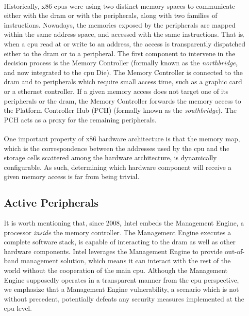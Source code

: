 
\paragraph{}
%
Historically, x86 \acp{cpu} were using two distinct memory spaces to communicate
either with the \ac{dram} or with the peripherals, along with two families of
instructions.
%
Nowadays, the memories exposed by the peripherals are mapped within the same
address space, and accessed with the same instructions.
%
That is, when a \ac{cpu} read at or write to an address, the access is
transparently dispatched either to the \ac{dram} or to a peripheral.
%
The first component to intervene in the decision process is the Memory
Controller (formally known as the \emph{northbridge}, and now integrated to the
\ac{cpu} Die).
%
The Memory Controller is connected to the \ac{dram} and to peripherals which
require small access time, such as a graphic card or a ethernet controller.
%
If a given memory access does not target one of its peripherals or the
\ac{dram}, the Memory Controller forwards the memory access to the Platform
Controller Hub (PCH) (formally known as the \emph{southbridge}).
%
The PCH acts as a proxy for the remaining peripherals.

\paragraph{}
%
One important property of x86 hardware architecture is that the memory map,
which is the correspondence between the addresses used by the \ac{cpu} and the
storage cells scattered among the hardware architecture, is dynamically
configurable.
%
As such, determining which hardware component will receive a given memory access
is far from being trivial.

\subsection{Active Peripherals}
\label{subsec:usecase:perif}

It is worth mentioning that, since 2008, Intel embeds the Management Engine, a
processor \emph{inside} the memory controller.
%
The Management Engine executes a complete software stack, is capable of
interacting to the \ac{dram} as well as other hardware components.
%
Intel leverages the Management Engine to provide out-of-band management
solution, which means it can interact with the rest of the world without the
cooperation of the main \ac{cpu}.
%
Although the Management Engine supposedly operates in a transparent manner from
the \ac{cpu} perspective, we emphasize that a Management Engine vulnerability, a
scenario which is not without precedent, potentially defeats any security
measures implemented at the \ac{cpu} level.

